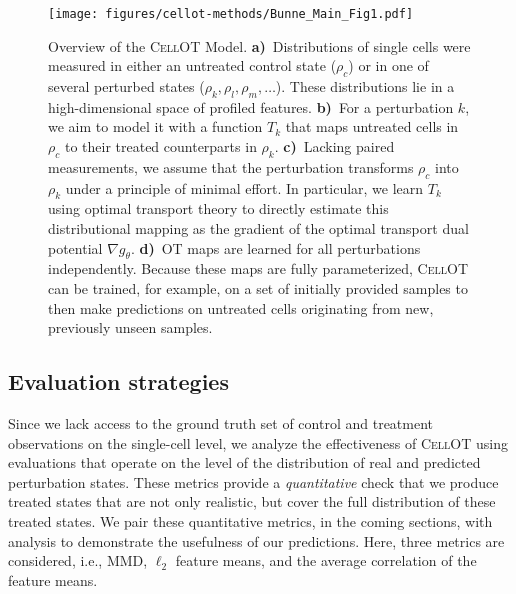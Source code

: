\begin{figure}
  \begin{center}
  \texttt{[image: figures/cellot-methods/Bunne\_Main\_Fig1.pdf]}
  \end{center}
  \caption{Overview of the \textsc{CellOT} Model. \textbf{a)}~Distributions of single cells were measured in either an untreated control state ($\rho_c$) or in one of several perturbed states ($\rho_k, \rho_l, \rho_m,  \ldots$). These distributions lie in a high-dimensional space of profiled features. \textbf{b)}~For a perturbation $k$, we aim to model it with a function $T_k$ that maps untreated cells in $\rho_c$ to their treated counterparts in $\rho_k$. \textbf{c)}~Lacking paired measurements, we assume that the perturbation transforms $\rho_c$ into $\rho_k$ under a principle of minimal effort. In particular, we learn $T_k$ using optimal transport theory to directly estimate this distributional mapping as the gradient of the optimal transport dual potential $\nabla g_\theta$.
    \textbf{d)}~OT maps are learned for all perturbations independently. Because these maps are fully parameterized, \textsc{CellOT} can be trained, for example, on a set of initially provided samples to then make predictions on untreated cells originating from new, previously unseen samples.}
  \label{fig:cellot-overview}
\end{figure}

\subsection{Evaluation strategies}
Since we lack access to the ground truth set of control and treatment observations on the single-cell level,
we analyze the effectiveness of \textsc{CellOT} using evaluations that operate on the level of the distribution of real and predicted perturbation states.
These metrics provide a \emph{quantitative} check that we produce treated states that are not only realistic, but cover the full distribution of these treated states.
We pair these quantitative metrics, in the coming sections, with analysis to demonstrate the usefulness of our predictions.
Here, three metrics are considered, i.e., MMD, $\ell_2$ feature means, and the average correlation of the feature means.

